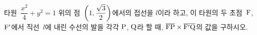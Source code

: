 타원~$\dfrac{x^2}{4}+y^2=1$ 위의 점~$\left(1{,}\mkern3mu\mathopen{}\dfrac{\sqrt{3}}{2}\right)$에서의 접선을 $l$이라 하고, 이 타원의 두 초점~$\mathrm{F}$, $\mathrm{F'}$에서 직선~$l$에 내린 수선의 발을 각각 $\mathrm{P}$, $\mathrm{Q}$라 할 때, $\overline{\mathrm{FP}}\times\overline{\mathrm{F'Q}}$의 값을 구하시오.
